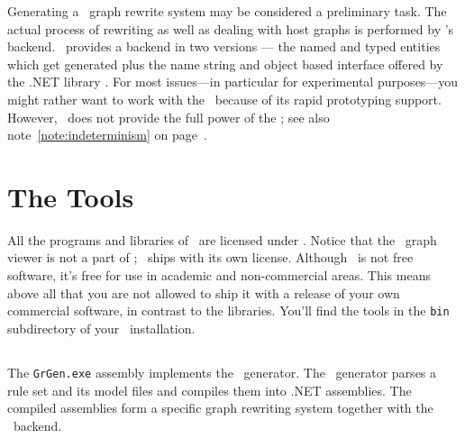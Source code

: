 Generating a \GrG\ graph rewrite system may be considered a preliminary task.
The actual process of rewriting as well as dealing with host graphs is performed by \GrG's backend.
\GrG\ provides a backend  in two versions --- the named and typed entities which get generated plus the name string and object based interface offered by the .NET library \LibGr.
For most issues---in particular for experimental purposes---you might rather want to work with the \GrShell\ because of its rapid prototyping support.
However, \GrShell\ does not provide the full power of the \LibGr; see also note~\ref{note:indeterminism} on page~\pageref{note:indeterminism}.


\section{The Tools}

All the programs and libraries of \GrG\ are licensed under .
Notice that the \yComp\ graph viewer is not a part of \GrG ; \yComp\ ships with its own license.
Although \yComp\ is not free software, it's free for use in academic and non-commercial areas.
This means above all that you are not allowed to ship it with a release of your own commercial software, in contrast to the \GrG libraries.
You'll find the tools in the \texttt{bin} subdirectory of your \GrG\ installation.


\subsection{\texttt{}} \label{grgenoptions}

\noindent The \texttt{GrGen.exe} assembly implements the \GrG\ generator.
The \GrG\ generator parses a rule set and its model files and compiles them into .NET assemblies.
The compiled assemblies form a specific graph rewriting system together with the \GrG\ backend.

